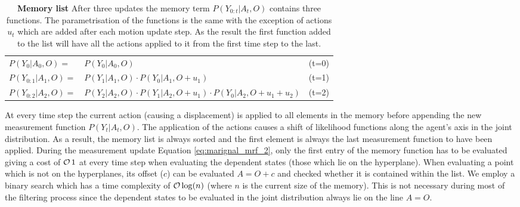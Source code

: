 \begin{table}
\begin{center}
 \begin{tabular}{llc}
 $P(Y_{0 }|A_0,O)  = $  & $P(Y_0|A_0,O)$				                            & (t=0) \\
 $P(Y_{0:1}|A_1,O) = $  & $P(Y_1|A_1,O) \cdot P(Y_0|A_1,O+u_1)$                             & (t=1) \\
 $P(Y_{0:2}|A_2,O) = $  & $P(Y_2|A_2,O) \cdot P(Y_1|A_2,O+u_1) \cdot P(Y_0|A_2,O+u_1+u_2)$  & (t=2)
\end{tabular}
\end{center}
\caption{\textbf{Memory list} After three updates the memory term $P(Y_{0:t}|A_t,O)$ contains three functions. The parametrisation
of the functions is the same with the exception of actions $u_t$ which are added after each motion update step. As the result the 
first function added to the list will have all the actions applied to it from the first time step to the last.}
\label{tab:memory_list}
\end{table}

At every time step the current action (causing a displacement) is applied to all elements in the memory before appending the new 
measurement function $P(Y_t|A_t,O)$. The application of the actions causes a shift of likelihood functions along the agent's axis
in the joint distribution. As a result, the memory list is always sorted and the first element is always the last measurement function
to have been applied. 
During the measurement update Equation \ref{eq:marignal_mrf_2}, only the first entry of the memory function has to be evaluated
giving a cost of $\operatorname{\mathcal{O}}{1}$ at every time step when evaluating the dependent states (those which lie on the hyperplane). When
evaluating a point which is not on the hyperplanes, its offset ($c$) can be evaluated $A=O+c$ and checked whether it is contained
within the list. We employ a binary search which has a time complexity of $\operatorname{\mathcal{O}}{\log(n)}$ (where $n$ is the current size of the memory). This is not necessary during most
of the filtering process since the dependent states to be evaluated in the joint distribution always lie on the line $A=O$.
